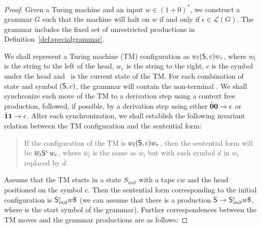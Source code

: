 \documentclass[preprint,9pt]{sigplanconf}
\begin{document}
\begin{proof}
Given a Turing machine and  an input $w\in (1+0)^*$, we
construct a grammar $G$ such that the machine will halt
on    $w$    if    and   only    if    $\epsilon    \in
\mathscr{L}(G)$. The grammar includes  the fixed set of
unrestricted               productions               in
Definition~\ref{def:specialgrammar}.

We shall represent a Turing machine (TM) configuration 
as $w_l(\mathsf{S},c)w_r$, where $w_l$ is the string to the
left of the head, $w_r$ is the string to the right, $c$
is the symbol under the head and \state\ is the current
state of  the TM.   For each combination  of state
and symbol  $(\mathsf{S},c)$, the grammar will  contain the
non-terminal . We shall synchronize each move
of the TM to  a derivation  step using  a context
free production, followed, if possible, by a derivation
step using either  $\bar{\mathbf{0}}\mathbf{0} \rightarrow \epsilon$ or
$\bar{\mathbf{1}}\mathbf{1}   \rightarrow    \epsilon$.    After   each
synchronization,  we  shall   establish  the  following
invariant  relation between  the TM  configuration
and the sentential form:

\begin{quote}
  If    the   configuration    of   the    TM   is
  $w_l(\mathsf{S},c)w_r$, then the  sentential form will be
  $\overline{w}_l\mathsf{S}_{}^{c}\,w_r$,                where
  $\overline{w}_l$ is  the same as $w_l$  but with each
  symbol $d$ in $w_l$ replaced by $\overline{d}$.
\end{quote}

Assume that  the TM starts  in a  state $S_\mathit{init}$ with  a tape
$cw$ and  the head positioned on  the symbol $c$. Then  the sentential
form    corresponding     to    the    initial     configuration    is
$\nont{\mathit{init}}{c}w\$$ (we  can assume that there  is a production
$\nont{}{} \rightarrow  \nont{\mathit{init}}{c}w\$$, where  \nont{}{} is
the start symbol of the  grammar). Further correspondences between the
TM moves and the grammar productions are as follows:


\end{proof}
\end{document}
